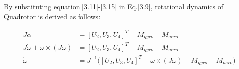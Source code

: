 By substituting equation \eqref{3.11}-\eqref{3.15} in Eq.\eqref{3.9}, rotational dynamics of Quadrotor is
derived as follows:
\begin{small}
\begin{equation}
\begin{align*}
J \alpha &= [U_2, U_3, U_4]^T - M_{gyro} - M_{aero} \\[6pt]
J\dot{\omega} + \omega \times (J\omega) &= [U_2, U_3, U_4]^T - M_{gyro} - M_{aero} \\[6pt]
\dot{\omega} &= J^{-1} \Big( [U_2, U_3, U_4]^T - \omega \times (J\omega) - M_{gyro} - M_{aero} \Big)
\end{align*} 
\end{equation}




\end{small}
